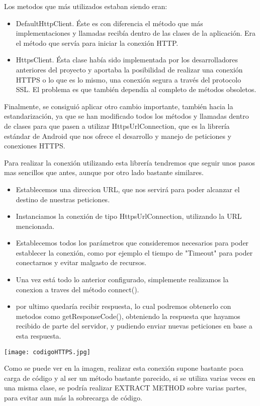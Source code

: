 Los metodos que más utilizados estaban siendo eran:

\begin{itemize}
\item DefaultHttpClient. Éste es con diferencia el método que más implementaciones y llamadas recibía dentro de las clases de la aplicación. Era el método que servía para iniciar la conexión HTTP.
\item HttpsClient. Ésta clase había sido implementada por los desarrolladores anteriores del proyecto y aportaba la posibilidad de realizar una conexión HTTPS o lo que es lo mismo, una conexión segura a través del protocolo SSL. El problema es que también dependía al completo de métodos obsoletos.
\end{itemize}

Finalmente, se consiguió aplicar otro cambio importante, también hacia la estandarización, ya que se han modificado todos los métodos y llamadas dentro de clases para que pasen a utilizar HttpsUrlConnection, que es la librería estándar de Android que nos ofrece el desarrollo y manejo de peticiones y conexiones HTTPS.

Para realizar la conexión utilizando esta librería tendremos que seguir unos pasos mas sencillos que antes, aunque por otro lado bastante similares.

\begin{itemize}
\item Establecemos una direccion URL, que nos servirá para poder alcanzar el destino de nuestras peticiones.
\item Instanciamos la conexión de tipo HttpsUrlConnection, utilizando la URL mencionada.
\item Establecemos todos los parámetros que consideremos necesarios para poder establecer la conexión, como por ejemplo el tiempo de "Timeout" para poder conectarnos y evitar malgasto de recursos.
\item Una vez está todo lo anterior configurado, simplemente realizamos la conexion a traves del método connect().
\item por ultimo quedaría recibir respuesta, lo cual podremos obtenerlo con metodos como getResponseCode(), obteniendo la respuesta que hayamos recibido de parte del servidor, y pudiendo enviar nuevas peticiones en base a esta respuesta.
\end{itemize}

\texttt{[image: codigoHTTPS.jpg]}

Como se puede ver en la imagen, realizar esta conexión supone bastante poca carga de código y al ser un método bastante parecido, si se utiliza varias veces en una misma clase, se podría realizar EXTRACT METHOD sobre varias partes, para evitar aun más la sobrecarga de código.

